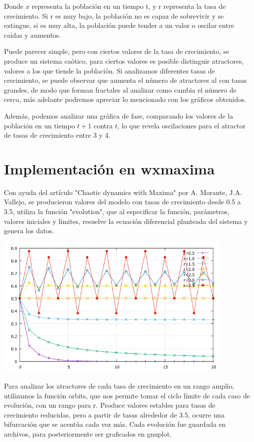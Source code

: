 \documentclass[a4paper]{article}
\begin{document}
Donde $x$ representa la población en un tiempo t, y r representa la tasa de crecimiento. Si r es muy bajo, la población no es capaz de sobrevivir y se extingue, si es muy alta, la población puede tender a un valor o oscilar entre caídas y aumentos.

Puede parecer simple, pero con ciertos valores de la tasa de crecimiento, se produce un sistema caótico, para ciertos valores es posible distinguir atractores, valores a los que tiende la población. Si analizamos diferentes tasas de crecimiento, se puede observar que aumenta el número de atractores al con tasas grandes, de modo que forman fractales al analizar como cambia el número de cerca, más adelante podremos apreciar lo mencionado con los gráficos obtenidos.

Además, podemos analizar una gráfica de fase, comparando los valores de la población en un tiempo $t+1$ contra $t$, lo que revela oscilaciones para el atractor de tasas de crecimiento entre 3 y 4.

\section{Implementación en wxmaxima}

Con ayuda del artículo "Chaotic dynamics with Maxima" por A. Morante, J.A. Vallejo, se producieron valores del modelo con tasas de crecimiento desde 0.5 a 3.5, utiliza la función "evolution", que al especificar la función, parámetros, valores iniciales y límites, resuelve la ecuación diferencial planteada del sistema y genera los datos.

\begin{center}
\includegraphics[height=7cm]{Grafica_Compilacion_1.png}
\end{center}

Para analizar los atractores de cada tasa de crecimiento en un rango amplio, utilizamos la función orbits, que nos permite tomar el ciclo límite de cada caso de evolución, con un rango para r. Produce valores estables para tasas de crecimiento reducidas, pero a partir de tasas alrededor de 3.5, ocurre una bifurcación que se acentúa cada vez más. Cada evolución fue guardada en archivos, para posteriormente ser graficados en gnuplot.
\end{document}
